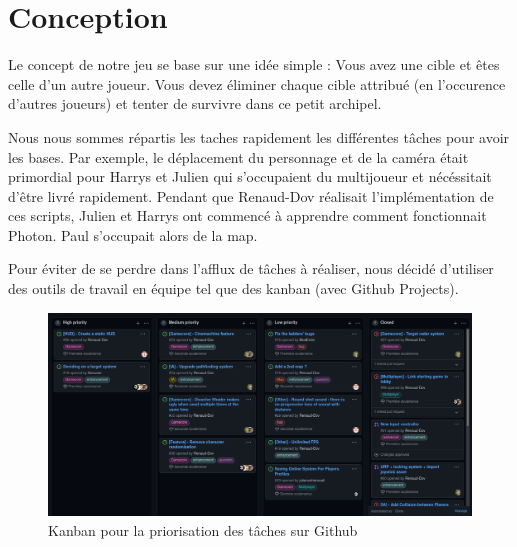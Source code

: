 \documentclass[french, 12pt]{article}
\begin{document}

\section{Conception}

    Le concept de notre jeu se base sur une idée simple : Vous avez une cible et êtes celle d'un autre joueur.
    Vous devez éliminer chaque cible attribué (en l'occurence d'autres joueurs) et tenter de survivre dans ce petit archipel.

    Nous nous sommes répartis les taches rapidement les différentes tâches pour avoir les bases.
    Par exemple, le déplacement du personnage et de la caméra était primordial pour Harrys et Julien qui s'occupaient du multijoueur et nécéssitait d'être livré rapidement.
    Pendant que Renaud-Dov réalisait l'implémentation de ces scripts, Julien et Harrys ont commencé à apprendre comment fonctionnait Photon. Paul s'occupait alors de la map.

    Pour éviter de se perdre dans l'afflux de tâches à réaliser, nous décidé d'utiliser des
    outils de travail en équipe tel que des kanban (avec Github Projects).\\
    

    \begin{figure}[hbt!]
        \centering
        \includegraphics[scale=0.28]{kanban.png}
        \caption{Kanban pour la priorisation des tâches sur Github}
    \end{figure}


    
\end{document}
